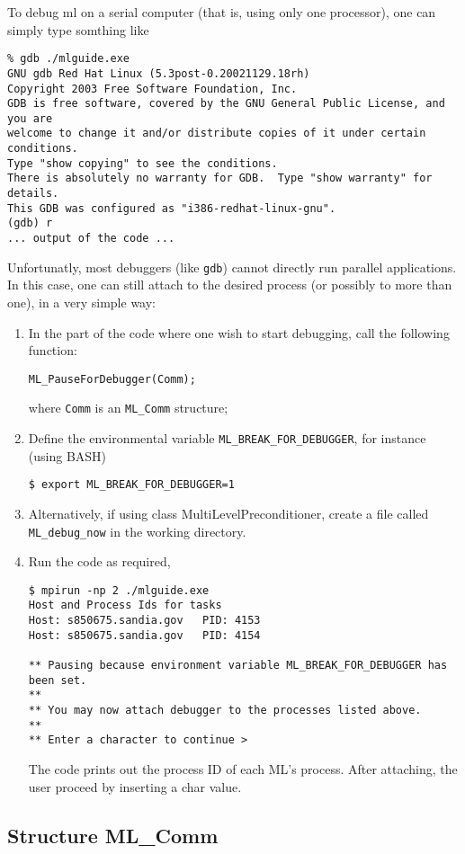\documentclass[10pt,letter,relax]{SANDreport}
\newcommand{\ML}     {{\sc ml }}
\begin{document}
To debug \ML on a serial computer (that is, using only one processor),
one can simply type somthing like
\begin{verbatim}
% gdb ./mlguide.exe
GNU gdb Red Hat Linux (5.3post-0.20021129.18rh)
Copyright 2003 Free Software Foundation, Inc.
GDB is free software, covered by the GNU General Public License, and you are
welcome to change it and/or distribute copies of it under certain conditions.
Type "show copying" to see the conditions.
There is absolutely no warranty for GDB.  Type "show warranty" for details.
This GDB was configured as "i386-redhat-linux-gnu".
(gdb) r
... output of the code ...
\end{verbatim}
Unfortunatly, most debuggers (like \verb!gdb!) cannot directly run
parallel applications. In this case, one can still attach to the desired
process (or possibly to more than one), in a very simple way:
\begin{enumerate}
\item In the part of the code where one wish to start debugging, call
  the following function:
\begin{verbatim}
ML_PauseForDebugger(Comm);
\end{verbatim}
where \verb!Comm! is an \verb!ML_Comm! structure;
\item Define the environmental variable \verb!ML_BREAK_FOR_DEBUGGER!,
  for instance (using BASH)
\begin{verbatim}
$ export ML_BREAK_FOR_DEBUGGER=1
\end{verbatim}
\item Alternatively, if using class MultiLevelPreconditioner, create a file
called \verb!ML_debug_now! in the working directory.
\item Run the code as required,
\begin{verbatim}
$ mpirun -np 2 ./mlguide.exe
Host and Process Ids for tasks
Host: s850675.sandia.gov   PID: 4153
Host: s850675.sandia.gov   PID: 4154

** Pausing because environment variable ML_BREAK_FOR_DEBUGGER has been set.
**
** You may now attach debugger to the processes listed above.
**
** Enter a character to continue >
\end{verbatim}
The code prints out the process ID of each ML's process. After
attaching, the user proceed by inserting a char value.
\end{enumerate}


\subsection{Structure ML\_Comm}
\end{document}
